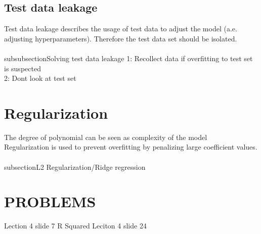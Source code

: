 \documentclass{article}
\begin{document}
\subsection{Test data leakage}
Test data leakage describes the usage of test data to adjust the model (a.e. adjusting hyperparameters). Therefore the test data set should be isolated.\\
\\subsubsection{Solving test data leakage}
1: Recollect data if overfitting to test set is suspected\\
2: Dont look at test set 
\section{Regularization}
The degree of polynomial can be seen as complexity of the model\\
Regularization is used to prevent overfitting by penalizing large coefficient values. \\ 
\\subsection{L2 Regularization/Ridge regression}

\section{PROBLEMS}
Lection 4 slide 7
R Squared
Leciton 4 slide 24
\end{document}
